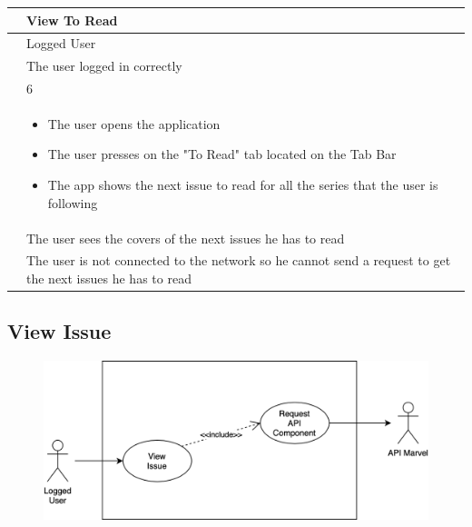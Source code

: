 {{{\renewcommand{\arraystretch}{2}
{\begin{center}
\begin{tabular}{ | m{4cm} | m{9cm} | } 
 \hline
 {\centering{\textbf{Name}}} & View To Read \\
 \hline
 {\centering{\textbf{Actor}}} & Logged User \\
 \hline
 {\centering{\textbf{Entry Condition}}} & The user logged in correctly \\
 \hline
 {\centering{\textbf{Goal}}} & 6 \\
 \hline
 {\centering{\textbf{Event flow}}} & \begin{itemize}[leftmargin=*]
 	\item The user opens the application
	\item The user presses on the "To Read" tab located on the Tab Bar
	\item The app shows the next issue to read for all the series that the user is following
	\end{itemize} \\	
 \hline
 {\centering{\textbf{Exit condition}}} & The user sees the covers of the next issues he has to read \\
 \hline
 {\centering{\textbf{Exceptions}}} & The user is not connected to the network so he cannot send a request to get the next issues he has to read \\
 \hline
\end{tabular}
\end{center}}

\clearpage

\subsection{View Issue}
\begin{figure}[h]
\centering
\includegraphics[width=\textwidth]{img/usecases/viewissue}
\end{figure}

}}}

